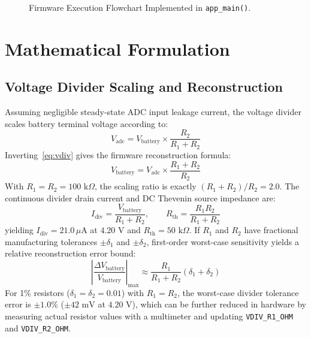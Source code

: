 \documentclass[12pt,a4paper]{article}
\begin{document}
\begin{figure}[H]
{%
}
\caption{Firmware Execution Flowchart Implemented in \texttt{app\_main()}.}
\label{fig:firmware_flowchart}
\end{figure}

\section{Mathematical Formulation}
\label{sec:math_formulation}

\subsection{Voltage Divider Scaling and Reconstruction}
Assuming negligible steady-state ADC input leakage current, the voltage divider scales battery terminal voltage according to:
\begin{equation}
    V_{\text{adc}} = V_{\text{battery}} \times \frac{R_2}{R_1 + R_2}
    \label{eq:vdiv}
\end{equation}
Inverting~\eqref{eq:vdiv} gives the firmware reconstruction formula:
\begin{equation}
    V_{\text{battery}} = V_{\text{adc}} \times \frac{R_1 + R_2}{R_2}
    \label{eq:vbat}
\end{equation}
With $R_1 = R_2 = 100\text{ k}\Omega$, the scaling ratio is exactly $(R_1 + R_2)/R_2 = 2.0$. The continuous divider drain current and DC Thevenin source impedance are:
\begin{equation}
    I_{\text{div}} = \frac{V_{\text{battery}}}{R_1 + R_2}, \qquad R_{\text{th}} = \frac{R_1 R_2}{R_1 + R_2}
    \label{eq:idiv_rth}
\end{equation}
yielding $I_{\text{div}} = 21.0\,\mu\text{A}$ at $4.20\text{ V}$ and $R_{\text{th}} = 50\text{ k}\Omega$. If $R_1$ and $R_2$ have fractional manufacturing tolerances $\pm \delta_1$ and $\pm \delta_2$, first-order worst-case sensitivity yields a relative reconstruction error bound:
\begin{equation}
    \left|\frac{\Delta V_{\text{battery}}}{V_{\text{battery}}}\right|_{\max} \approx \frac{R_1}{R_1 + R_2}(\delta_1 + \delta_2)
    \label{eq:tol_err}
\end{equation}
For 1\% resistors ($\delta_1 = \delta_2 = 0.01$) with $R_1 = R_2$, the worst-case divider tolerance error is $\pm 1.0\%$ ($\pm 42\text{ mV}$ at $4.20\text{ V}$), which can be further reduced in hardware by measuring actual resistor values with a multimeter and updating \texttt{VDIV\_R1\_OHM} and \texttt{VDIV\_R2\_OHM}.
\end{document}
